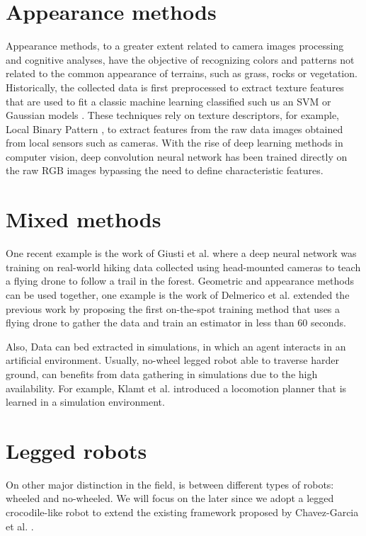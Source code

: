 \documentclass[../document.tex]{subfiles}
\begin{document}
\section{Appearance methods}
Appearance methods, to a greater extent related to camera images processing and cognitive analyses, have the objective of recognizing colors and patterns not related to the common appearance of terrains, such as grass, rocks or vegetation. Historically, the collected data is first preprocessed to extract texture features that are used to fit a classic machine learning classified such us an SVM \cite{ugur2010traversability} or Gaussian models \cite{sofman2006improving}. These techniques rely on texture descriptors, for example, Local Binary Pattern \cite{ojala2002multiresolution}, to extract features from the raw data images obtained from local sensors such as cameras.
With the rise of deep learning methods in computer vision, deep convolution neural network has been trained directly on the raw RGB images bypassing the need to define characteristic features. 

\section{Mixed methods}
One recent example is the work of Giusti et al. \cite{giusti2015amachine} where a deep neural network was training on real-world hiking data collected using head-mounted cameras to teach a flying drone to follow a trail in the forest. 
Geometric and appearance methods can be used together, one example is the work of Delmerico et al.\cite{delmerico2017onthespot} extended the previous work \cite{delmerico2016active} by proposing the first on-the-spot training method that uses a flying drone to gather the data and train an estimator in less than 60 seconds. 

Also, Data can bed extracted in simulations, in which an agent interacts in an artificial environment. Usually, no-wheel legged robot able to traverse harder ground, can benefits from data gathering in simulations due to the high availability. For example, Klamt et al. \cite{tobias2017anytime} introduced a locomotion planner that is learned in a simulation environment. 
\section{Legged robots}
On other major distinction in the field, is between different types of robots: wheeled and no-wheeled. We will focus on the later since we adopt a legged crocodile-like robot to extend the existing framework proposed by Chavez-Garcia et al. \cite{omar2018traversability}.
\end{document}
